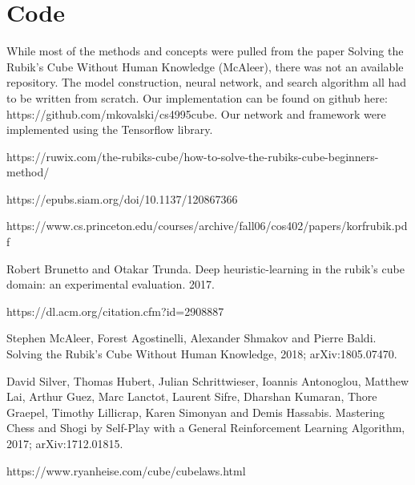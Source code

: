 \documentclass[10pt,twocolumn,letterpaper]{article}
\begin{document}



\section{Code}

While most of the methods and concepts were pulled from the paper Solving the Rubik’s Cube Without Human Knowledge (McAleer), there was not an available repository.  The model construction, neural network, and search algorithm all had to be written from scratch.  Our implementation can be found on github here: https://github.com/mkovalski/cs4995\textunderscore cube.  Our network and framework were implemented using the Tensorflow library. 




\begin{thebibliography}{9}

\bibitem{}
https://ruwix.com/the-rubiks-cube/how-to-solve-the-rubiks-cube-beginners-method/

\bibitem{}
https://epubs.siam.org/doi/10.1137/120867366

\bibitem{}
https://www.cs.princeton.edu/courses/archive/fall06/cos402/papers/korfrubik.pdf

\bibitem{}
Robert Brunetto and Otakar Trunda. Deep heuristic-learning in the rubik’s cube domain: an experimental evaluation. 2017.

\bibitem{}
https://dl.acm.org/citation.cfm?id=2908887

Stephen McAleer, Forest Agostinelli, Alexander Shmakov and Pierre Baldi.
\newblock Solving the Rubik's Cube Without Human Knowledge, 2018;
\newblock arXiv:1805.07470.

David Silver, Thomas Hubert, Julian Schrittwieser, Ioannis Antonoglou, Matthew Lai, Arthur Guez, Marc Lanctot, Laurent Sifre, Dharshan Kumaran, Thore Graepel, Timothy Lillicrap, Karen Simonyan and Demis Hassabis.
\newblock Mastering Chess and Shogi by Self-Play with a General Reinforcement Learning Algorithm, 2017;
\newblock arXiv:1712.01815.

\bibitem{}
https://www.ryanheise.com/cube/cube\textunderscore laws.html


\end{thebibliography}

{\small


}
\end{document}
